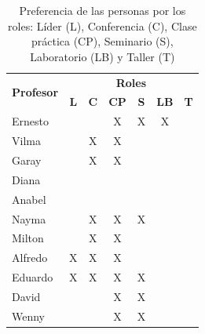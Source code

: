 {\begin{table}[H]
	\centering
	\caption{Preferencia de las personas por los roles: Líder (L), Conferencia (C), Clase práctica (CP), Seminario (S), Laboratorio (LB) y Taller (T)}\label{table:pref-pers-roles-doc2}
	\begin{tabular}{l c c c c c c }
		\toprule
		\multirow{2}{2.5cm}{\textbf{Profesor}} &                      \multicolumn{6}{c}{\textbf{Roles}}                       \\ \cline{2-7}
		                                       & \textbf{L} & \textbf{C} & \textbf{CP} & \textbf{S} & \textbf{LB} & \textbf{T} \\ \midrule
		Ernesto                                &            &            & X           & X          & X           &  \\ \hline
		Vilma                                  &            & X          & X           &            &  \\ \hline
		Garay                                  &            & X          & X           &            &  \\ \hline
		Diana                                  &            &            &             &            &  \\ \hline
		Anabel                                 &            &            &             &            &  \\ \hline
		Nayma                                  &            & X          & X           & X          &  \\ \hline
		Milton                                 &            & X          & X           &            &  \\ \hline
		Alfredo                                & X          & X          & X           &            &  \\ \hline
		Eduardo                                & X          & X          & X           & X          &  \\ \hline
		David                                  &            &            & X           & X          &  \\ \hline
		Wenny                                  &            &            & X           & X          &             &  \\ \bottomrule
	\end{tabular}
\end{table}

}
